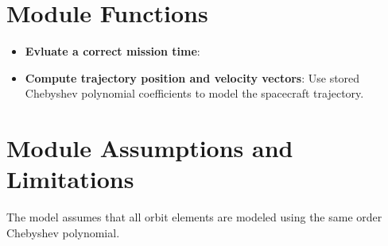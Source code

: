 

\section{Module Functions}
\begin{itemize}
	\item \textbf{Evluate a correct mission time}:
	\item \textbf{Compute trajectory position and velocity vectors}: Use stored Chebyshev polynomial coefficients to model the spacecraft trajectory.
\end{itemize}

\section{Module Assumptions and Limitations}
The model assumes that all orbit elements are modeled using the same order Chebyshev polynomial.  